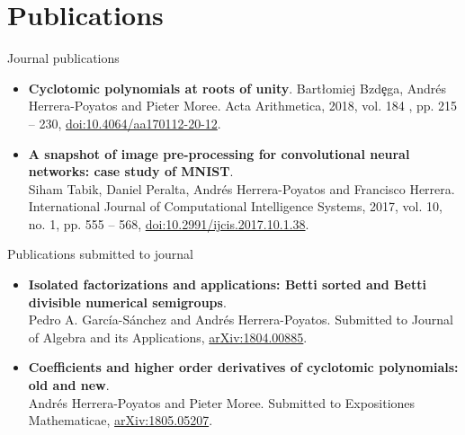 \documentclass[10pt,a4paper,sans]{moderncv} %
\begin{document}

\section{Publications}


{\large \textcolor{color1}{Journal publications}}

	\begin{itemize}
        \item \textbf{Cyclotomic polynomials at roots of unity}. Bart{\l}omiej Bzd\c{e}ga, Andrés Herrera-Poyatos and Pieter Moree.
         Acta Arithmetica, 2018, vol. 184 , pp. 215 -- 230, \textcolor{colorl}{\href{https://www.impan.pl/en/publishing-house/journals-and-series/acta-arithmetica/all/184/3/112566/cyclotomic-polynomials-at-roots-of-unity}{doi:10.4064/aa170112-20-12}}.
	\item \textbf{A snapshot of image pre-processing for convolutional neural networks: case study of MNIST}. \\ Siham Tabik, Daniel Peralta, Andrés Herrera-Poyatos and Francisco Herrera. International Journal of Computational Intelligence Systems, 2017, vol. 10, no. 1, pp. 555 -- 568, \textcolor{colorl}{\href{http://www.atlantis-press.com/journals/ijcis/25867315}{doi:10.2991/ijcis.2017.10.1.38}}.
	\end{itemize}

{\large \textcolor{color1}{Publications submitted to journal}}

\begin{itemize}
	\item \textbf{Isolated factorizations and applications: Betti sorted and Betti divisible numerical semigroups}. \\ Pedro A. Garc\'ia-S\'anchez and Andr\'es Herrera-Poyatos. Submitted to Journal of Algebra and its Applications, \textcolor{colorl}{\href{https://arxiv.org/abs/1804.00885}{arXiv:1804.00885}}.
	\item \textbf{Coefficients and higher order derivatives of cyclotomic polynomials: old and new}. \\ Andr\'es Herrera-Poyatos and Pieter Moree.
	Submitted to Expositiones Mathematicae, \textcolor{colorl}{\href{https://arxiv.org/abs/1805.05207}{arXiv:1805.05207}}.
\end{itemize}
\end{document}
